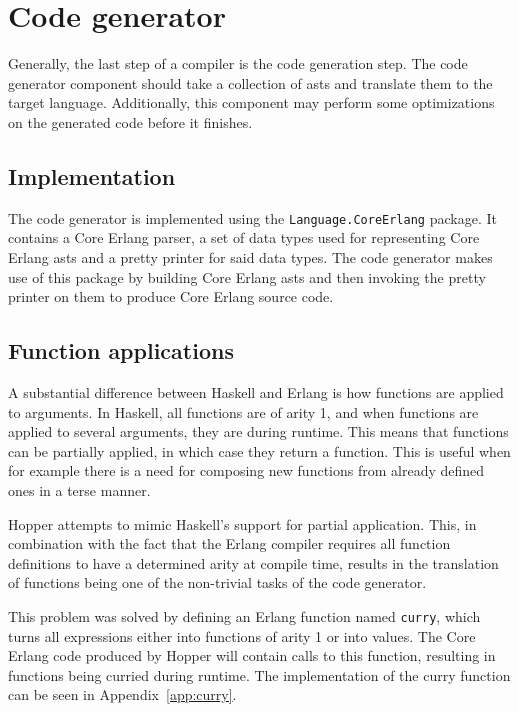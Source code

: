 \section{Code generator}

Generally, the last step of a compiler is the code generation step. The code generator
component should take a collection of \glspl{ast} and translate them to the target language. Additionally, this component may perform some optimizations on the generated code before it finishes.

\subsection{Implementation}

The code generator is implemented using the \texttt{Language.CoreErlang} \cite{CoreErlang} package. It contains a Core Erlang parser, a set of data types used for representing Core Erlang \glspl{ast} and a pretty printer for said data types. The code generator makes use of this package by building Core Erlang \glspl{ast} and then invoking the pretty printer on them to produce Core Erlang source code.

\subsection{Function applications}

A substantial difference between Haskell and Erlang is how functions are applied to arguments. In Haskell, all functions are of \gls{arity} 1, and when functions are applied to several arguments, they are  during runtime. This means that functions can be partially applied, in which case they return a function. This is useful when for example there is a need for composing new functions from already defined ones in a terse manner.

Hopper attempts to mimic Haskell's support for partial application. This, in combination with the fact that the Erlang compiler requires all function definitions to have a determined \gls{arity} at compile time, results in the translation of functions being one of the non-trivial tasks of the code generator.

This problem was solved by defining an Erlang function named \texttt{curry}, which turns all expressions either into functions of \gls{arity} 1 or into values. The Core Erlang code produced by Hopper will contain calls to this function, resulting in functions being curried during runtime. The implementation of the curry function can be seen in Appendix~\ref{app:curry}.

